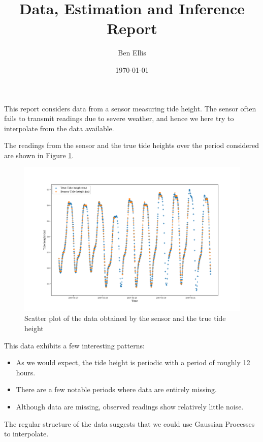 \documentclass{article}
\begin{document}
\title{Data, Estimation and Inference Report}
\author{Ben Ellis}
\date{\today}
\maketitle

This report considers data from a sensor measuring tide height.
The sensor often fails to transmit readings due to severe weather, and 
hence we here try to interpolate from the data available.

The readings from the sensor and the true tide heights over the period 
considered are shown in Figure \ref{fig:scatter}. 

\begin{figure}
    \centering
    \includegraphics[width=\textwidth]{sensor_scatter}
    \caption{Scatter plot of the data obtained by the sensor and the true tide height}
    \label{fig:scatter}
\end{figure}

This data exhibits a few interesting patterns:
\begin{itemize}
    \item As we would expect, the tide height is periodic with a period of roughly 12 hours.
    \item There are a few notable periods where data are entirely missing.
    \item Although data are missing, observed readings show relatively little noise.
\end{itemize}

The regular structure of the data suggests that we could use Gaussian Processes to interpolate.
\end{document}
